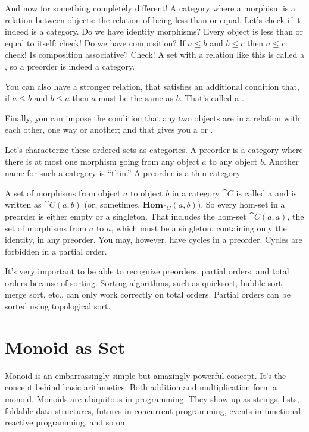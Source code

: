 And now for something completely different! A category where a morphism
is a relation between objects: the relation of being less than or equal.
Let's check if it indeed is a category. Do we have identity morphisms?
Every object is less than or equal to itself: check! Do we have
composition? If $a \leqslant b$ and $b \leqslant c$ then $a \leqslant c$: check! Is composition associative? Check! A set with a
relation like this is called a , so a preorder is indeed
a category.

You can also have a stronger relation, that satisfies an additional
condition that, if $a \leqslant b$ and $b \leqslant a$ then $a$ must be
the same as $b$. That's called a .

Finally, you can impose the condition that any two objects are in a
relation with each other, one way or another; and that gives you a
 or .

Let's characterize these ordered sets as categories. A preorder is a
category where there is at most one morphism going from any object $a$ to
any object $b$. Another name for such a category is ``thin.'' A preorder
is a thin category.

A set of morphisms from object $a$ to object $b$ in a category $\cat{C}$ is called a
 and is written as $\cat{C}(a, b)$ (or, sometimes,
$\mathbf{Hom}_{\cat{C}}(a, b)$). So every hom-set in a preorder is either
empty or a singleton. That includes the hom-set $\cat{C}(a, a)$, the set of
morphisms from $a$ to $a$, which must be a singleton, containing only the
identity, in any preorder. You may, however, have cycles in a preorder.
Cycles are forbidden in a partial order.

It's very important to be able to recognize preorders, partial orders,
and total orders because of sorting. Sorting algorithms, such as
quicksort, bubble sort, merge sort, etc., can only work correctly on
total orders. Partial orders can be sorted using topological sort.

\section{Monoid as Set}

Monoid is an embarrassingly simple but amazingly powerful concept. It's
the concept behind basic arithmetics: Both addition and multiplication
form a monoid. Monoids are ubiquitous in programming. They show up as
strings, lists, foldable data structures, futures in concurrent
programming, events in functional reactive programming, and so on.

